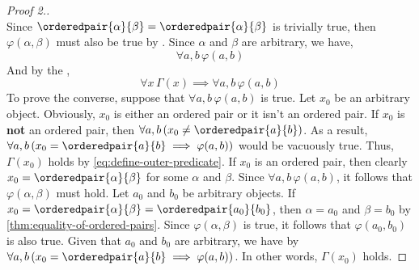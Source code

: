 \begin{proof}[Proof 2.]
\begin{equation*}
    \end{equation*}
    Since \( \orderedpair{\alpha}{\beta} = \orderedpair{\alpha}{\beta} \) is trivially true, then
    \( \varphi(\alpha, \beta) \) must also be true by . Since \( \alpha \) and \( \beta \)
    are arbitrary, we have,
    \begin{equation*}
        \forall a,b \, \varphi(a,b)
    \end{equation*}
    And by the ,
    \begin{equation*}
        \forall x \, \Gamma(x) \implies \forall a,b \, \varphi(a,b)
    \end{equation*}
    To prove the converse, suppose that \( \forall a,b \, \varphi(a,b) \) is true. Let \( x_{0} \) be
    an arbitrary object. Obviously, \( x_{0} \) is either an ordered pair or it isn't an ordered pair.
    If \( x_{0} \) is {\bfseries not} an ordered pair, then \( \forall a,b \, \mleft( x_{0} \neq \orderedpair{a}{b} \mright) \).
    As a result, \( \forall a,b \, \mleft( x_{0} = \orderedpair{a}{b} \implies \varphi(a,b) \mright) \) would be
    vacuously  true. Thus, \( \Gamma(x_{0}) \) holds by \eqref{eq:define-outer-predicate}. If \( x_{0} \) is an ordered pair,
    then clearly \( x_{0} = \orderedpair{\alpha}{\beta} \) for some \( \alpha \) and \( \beta \). Since \( \forall a,b \, \varphi(a,b)\),
    it follows that \( \varphi(\alpha,\beta) \) must hold. Let \( a_{0} \) and \( b_{0} \) be arbitrary objects.
    If \( x_{0} = \orderedpair{\alpha}{\beta} = \orderedpair{a_{0}}{b_{0}} \), then \( \alpha = a_{0} \) and \( \beta = b_{0} \) by
    \cref{thm:equality-of-ordered-pairs}. Since \( \varphi(\alpha, \beta) \) is true, it follows that \( \varphi(a_{0}, b_{0}) \) is also true.
    Given that \( a_{0} \) and \( b_{0} \) are arbitrary,
    we have by  \( \forall a,b \, \mleft( x_{0} = \orderedpair{a}{b} \implies \varphi(a,b) \mright) \).
    In other words, \( \Gamma(x_{0}) \) holds.


\end{proof}
